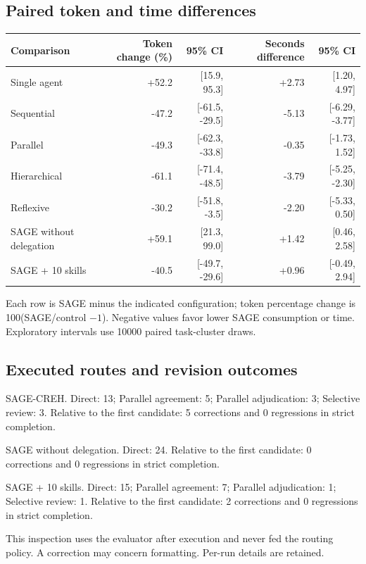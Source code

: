 \subsection{Paired token and time differences}

\begin{center}\footnotesize\setlength{\tabcolsep}{3pt}\begin{tabularx}{\linewidth}{@{}Xrrrr@{}}\toprule
Comparison & Token change (\%) & 95\% CI & Seconds difference & 95\% CI \\ \midrule
Single agent & +52.2 & [15.9, 95.3] & +2.73 & [1.20, 4.97] \\
Sequential & -47.2 & [-61.5, -29.5] & -5.13 & [-6.29, -3.77] \\
Parallel & -49.3 & [-62.3, -33.8] & -0.35 & [-1.73, 1.52] \\
Hierarchical & -61.1 & [-71.4, -48.5] & -3.79 & [-5.25, -2.30] \\
Reflexive & -30.2 & [-51.8, -3.5] & -2.20 & [-5.33, 0.50] \\
SAGE without delegation & +59.1 & [21.3, 99.0] & +1.42 & [0.46, 2.58] \\
SAGE + 10 skills & -40.5 & [-49.7, -29.6] & +0.96 & [-0.49, 2.94] \\
\bottomrule\end{tabularx}\end{center}

Each row is SAGE minus the indicated configuration; token percentage change is 100(SAGE/control $-1$). Negative values favor lower SAGE consumption or time. Exploratory intervals use 10000 paired task-cluster draws.

\subsection{Executed routes and revision outcomes}

SAGE-CREH. Direct: 13; Parallel agreement: 5; Parallel adjudication: 3; Selective review: 3. Relative to the first candidate: 5 corrections and 0 regressions in strict completion.

SAGE without delegation. Direct: 24. Relative to the first candidate: 0 corrections and 0 regressions in strict completion.

SAGE + 10 skills. Direct: 15; Parallel agreement: 7; Parallel adjudication: 1; Selective review: 1. Relative to the first candidate: 2 corrections and 0 regressions in strict completion.

This inspection uses the evaluator after execution and never fed the routing policy. A correction may concern formatting. Per-run details are retained.

